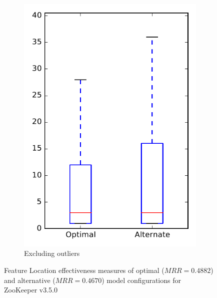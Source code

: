 \begin{figure}
\begin{subfigure}{.4\textwidth}
        \includegraphics[height=0.4\textheight]{figures/combo/flt_rq1_zookeeper_no_outlier}
        \caption{Excluding outliers}\label{fig:combo:flt:rq1:zookeeper_no_outlier}
    \end{subfigure}
\caption[Feature Location effectiveness measures of optimal and alternative model configurations for ZooKeeper v3.5.0]%
{Feature Location effectiveness measures of optimal ($MRR=0.4882$) and alternative ($MRR=0.4670$) model configurations for ZooKeeper v3.5.0}
\label{fig:combo:flt:rq1:zookeeper}
\end{figure}
